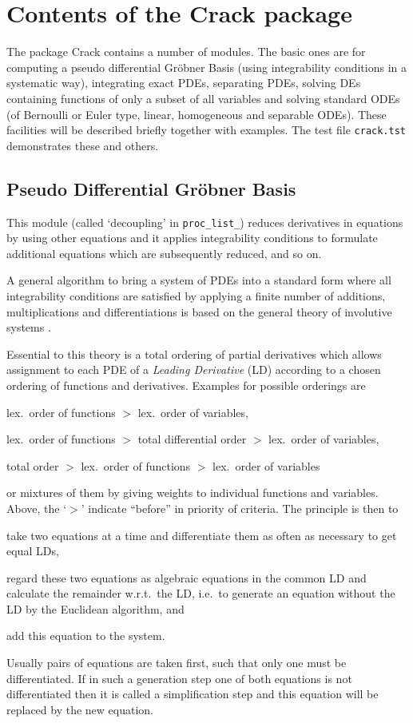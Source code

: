 \documentclass[12pt]{article}
\begin{document}
\section{Contents of the Crack package}
The package {\sc Crack} contains a number of modules. 
The basic ones are for computing a pseudo differential Gr\"{o}bner
Basis (using integrability conditions in a systematic way), integrating
exact PDEs, separating PDEs, solving DEs containing functions of only
a subset of all variables and solving standard ODEs (of Bernoulli or
Euler type, linear, homogeneous and separable ODEs). These facilities
will be described briefly together with examples. The test file
{\tt crack.tst} demonstrates these and others.

\subsection{Pseudo Differential Gr\"{o}bner Basis}
This module (called `decoupling' in {\tt proc\_list\_})
reduces derivatives in equations by using other equations and it applies
integrability conditions to formulate additional equations which are
subsequently reduced, and so on.

A general algorithm to bring a system of PDEs into a standard form
where all integrability conditions are satisfied by applying
a finite number of additions, multiplications and differentiations
is based on the general theory of involutive systems \cite{Riq,Th,Ja}.

Essential to this theory is a total ordering of partial derivatives
which allows assignment to each PDE of a {\em Leading Derivative} 
(LD) according to a chosen ordering of functions
and derivatives. Examples for possible orderings are 
\begin{description}
\item lex.\ order of functions $>$ lex.\ order of variables,
\item lex.\ order of functions $>$ total differential order $>$ lex.\ 
      order of variables,
\item total order $>$ lex.\ order of functions $>$ lex.\ order of variables
\end{description}
or mixtures of them by giving weights to individual functions and variables.
Above, the `$>$' indicate ``before'' in priority of criteria. The principle
is then to
\begin{description}
\item take two equations at a time and differentiate them as often as 
necessary to get equal LDs,
\item regard these two equations as algebraic equations in
the common LD and calculate the remainder w.r.t.\ the LD, i.e.\ to
generate an equation without the LD by the Euclidean algorithm, and
\item add this equation to the system.
\end{description}
Usually pairs of equations are taken first, such that only one must be
differentiated. If in such a generation step one of both equations is not
differentiated then it is called a
simplification step and this equation will be replaced by the new equation.
\end{document}
